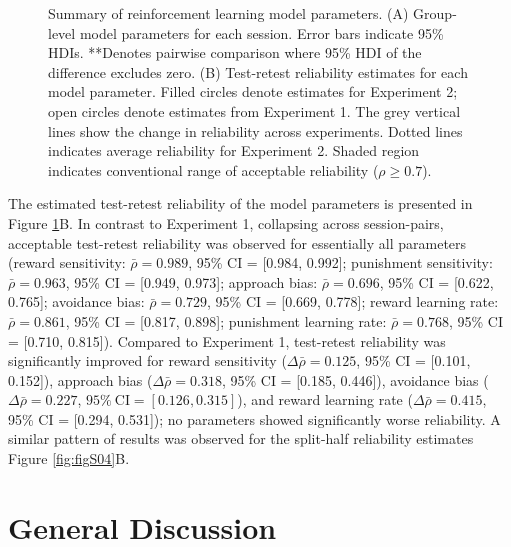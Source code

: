 \documentclass[a4paper,12pt]{article}
\begin{document}
\begin{refsection}[main]
\begin{figure}[b!]
    \centerline{}
    \caption{Summary of reinforcement learning model parameters. (A) Group-level model parameters for each session. Error bars indicate 95\% HDIs. **Denotes pairwise comparison where 95\% HDI of the difference excludes zero. (B) Test-retest reliability estimates for each model parameter. Filled circles denote estimates for Experiment 2; open circles denote estimates from Experiment 1. The grey vertical lines show the change in reliability across experiments. Dotted lines indicates average reliability for Experiment 2. Shaded region indicates conventional range of acceptable reliability ($\rho \geq 0.7$).}
    \label{fig:exp02_modeling}
\end{figure}

The estimated test-retest reliability of the model parameters is presented in Figure \ref{fig:exp02_modeling}B. In contrast to Experiment 1, collapsing across session-pairs, acceptable test-retest reliability was observed for essentially all parameters (reward sensitivity: $\bar{\rho} = 0.989$, 95\% CI = [0.984, 0.992]; punishment sensitivity: $\bar{\rho} = 0.963$, 95\% CI = [0.949, 0.973]; approach bias: $\bar{\rho} = 0.696$, 95\% CI = [0.622, 0.765]; avoidance bias: $\bar{\rho} = 0.729$, 95\% CI = [0.669, 0.778]; reward learning rate: $\bar{\rho} = 0.861$, 95\% CI = [0.817, 0.898]; punishment learning rate: $\bar{\rho} = 0.768$, 95\% CI = [0.710, 0.815]). Compared to Experiment 1, test-retest reliability was significantly improved for reward sensitivity ($\Delta\bar{\rho} = 0.125$, 95\% CI = [0.101, 0.152]), approach bias ($\Delta\bar{\rho} = 0.318$, 95\% CI = [0.185, 0.446]), avoidance bias ($\Delta\bar{\rho} = 0.227$, $95\% \ \text{CI} = [0.126, 0.315]$), and reward learning rate ($\Delta\bar{\rho} = 0.415$, 95\% CI = [0.294, 0.531]); no parameters showed significantly worse reliability. A similar pattern of results was observed for the split-half reliability estimates Figure \ref{fig:figS04}B.

\section*{General Discussion}


\end{refsection}
\end{document}
